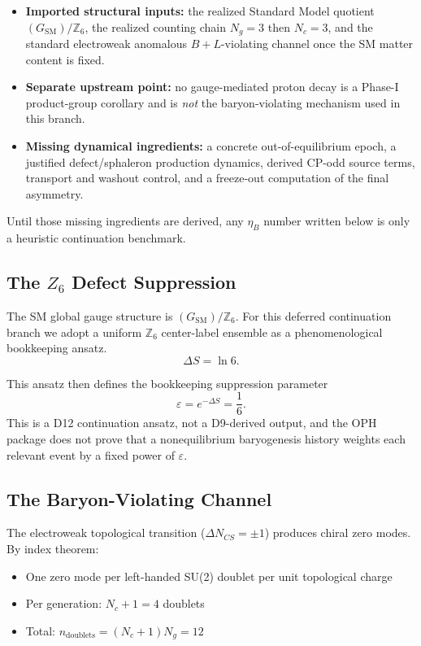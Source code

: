 \begin{itemize}
\tightlist
\item
 \textbf{Imported structural inputs:} the realized Standard Model quotient \((G_{\text{SM}})/\mathbb{Z}_6\), the realized counting chain \(N_g = 3\) then \(N_c = 3\), and the standard electroweak anomalous \(B+L\)-violating channel once the SM matter content is fixed.
\item
 \textbf{Separate upstream point:} no gauge-mediated proton decay is a Phase-I product-group corollary and is \emph{not} the baryon-violating mechanism used in this branch.
\item
 \textbf{Missing dynamical ingredients:} a concrete out-of-equilibrium epoch, a justified defect/sphaleron production dynamics, derived CP-odd source terms, transport and washout control, and a freeze-out computation of the final asymmetry.
\end{itemize}

Until those missing ingredients are derived, any \(\eta_B\) number written below is only a heuristic continuation benchmark.

\subsection{\texorpdfstring{The \(Z_6\) Defect Suppression}{The Z6 Defect Suppression}}\label{111-the-zux2086-defect-suppression}

The SM global gauge structure is \((G_{\text{SM}})/\mathbb{Z}_6\). For this deferred continuation branch we adopt a uniform \(\mathbb{Z}_6\) center-label ensemble as a phenomenological bookkeeping ansatz.
\[
\Delta S = \ln 6.
\]

This ansatz then defines the bookkeeping suppression parameter
\[
\varepsilon = e^{-\Delta S} = \frac{1}{6}.
\]
This is a D12 continuation ansatz, not a D9-derived output, and the OPH package does not prove that a nonequilibrium baryogenesis history weights each relevant event by a fixed power of \(\varepsilon\).

\subsection{The Baryon-Violating Channel}\label{112-the-baryon-violating-channel}

The electroweak topological transition (\(\Delta N_{CS} = \pm 1\)) produces chiral zero modes. By index theorem:

\begin{itemize}
\tightlist
\item
 One zero mode per left-handed SU(2) doublet per unit topological charge
\item
 Per generation: \(N_c + 1 = 4\) doublets
\item
 Total: \(n_{\text{doublets}} = (N_c + 1)N_g = 12\)
\end{itemize}

